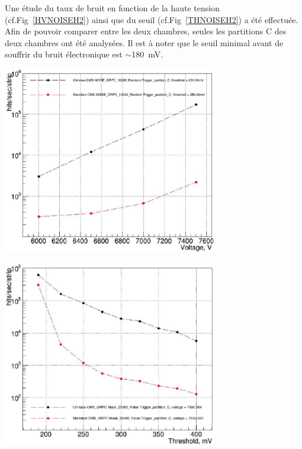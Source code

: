 Une étude du taux de bruit en fonction de la haute tension (cf.Fig~\ref{HVNOISEH2}) ainsi que du seuil (cf.Fig~\ref{THNOISEH2}) a été effectuée. Afin de pouvoir comparer entre les deux chambres, seules les partitions C des deux chambres ont été analysées.
Il est à noter que le seuil minimal avant de souffrir du bruit électronique est $\sim$\SI{180}{\milli\volt}.

\noindent
\begin{minipage}[th!]{0.98\textwidth}
	\noindent
	\centering
	\includegraphics[width=0.70\textwidth]{GLA/HVNOISEH2.png}
	\label{HVNOISEH2}
\end{minipage}%


\noindent
\begin{minipage}[th!]{0.98\textwidth}
	\noindent
	\centering
	\includegraphics[width=0.70\textwidth]{GLA/THNOISEH2.png}
	\label{THNOISEH2}
\end{minipage}%

